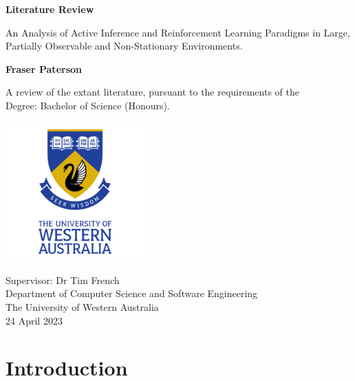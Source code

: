 \documentclass[12pt, oneside]{article}
\begin{document}
\begin{titlepage}
	\begin{center}
	
	\vspace*{0.5cm}
	
	\Huge
	\textbf{Literature Review}
	
	\vspace{0.5cm}
	\Large
	An Analysis of Active Inference and Reinforcement Learning Paradigms in Large, Partially Observable and Non-Stationary Environments.
	
	\vspace{1.5cm}

	\textbf{Fraser Paterson}

	\vspace{1.5cm}

	A review of the extant literature, pursuant to the requirements of the\\ 
	Degree: Bachelor of Science (Honours).  
	
	\vspace{2.0cm}

	\includegraphics[width=0.4\textwidth]{UWA_Logo.png}
	
	\vspace{2.0cm}	
	
	\Large
	Supervisor: Dr Tim French\\ 
	Department of Computer Science and Software Engineering\\
	The University of Western Australia\\
	24 April 2023
	\end{center}
\end{titlepage}


\tableofcontents

\cleardoublepage

\section{Introduction}
\end{document}
